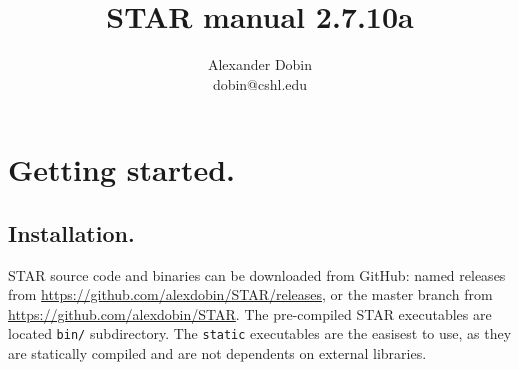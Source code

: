 \documentclass[12pt]{article}
\begin{document}
\hypersetup{
	linkcolor=MidnightBlue
	}


\newcommand{\optn}[1]{\sloppy\textcolor{violet}{\texttt{--#1}}}
\newcommand{\opt}[1]{\sloppy\hyperlink{#1}{\optn{#1}}}
\newcommand{\optv}[1]{\sloppy\texttt{#1}}
\newcommand{\optvr}[1]{\sloppy\textit{\texttt{#1}}}

\newcommand{\code}[1]{\sloppy\texttt{#1}}

\newcommand{\codelines}[1]{\begin{adjustwidth}{0.5in}{0in}
	\raggedright\texttt{#1}
	\end{adjustwidth}}

\newcommand{\ofilen}[1]{\sloppy\texttt{#1}}

\newcommand{\sechyperref}[1]{\hyperref[#1]{Section \ref{#1}. \nameref{#1}}}

\title{STAR manual 2.7.10a}
\author{Alexander Dobin\\
dobin@cshl.edu}
\maketitle

\makeatletter
\renewcommand*\l@subsection{\@dottedtocline{2}{1.8em}{2.7 em}}
\renewcommand*\l@subsubsection{\@dottedtocline{2}{4.5em}{2.7 em}}
\makeatother
\tableofcontents

\newpage

\section{Getting started.}
\subsection{Installation.}

STAR source code and binaries can be downloaded from GitHub: named releases from \url{https://github.com/alexdobin/STAR/releases}, or the master branch from \url{https://github.com/alexdobin/STAR}. The pre-compiled STAR executables are  located \code{bin/} subdirectory. The \code{static} executables are the easisest to use, as they are statically compiled and are not dependents on external libraries.
\end{document}
